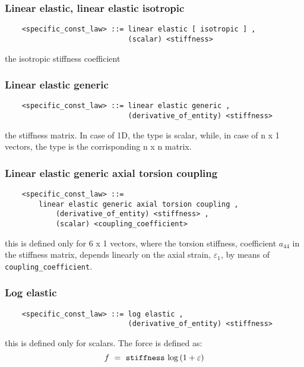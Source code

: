 \subsubsection{Linear elastic, linear elastic isotropic}
\begin{verbatim}
    <specific_const_law> ::= linear elastic [ isotropic ] , 
                             (scalar) <stiffness>
\end{verbatim}
the isotropic stiffness coefficient
  
  
\subsubsection{Linear elastic generic}
\begin{verbatim}
    <specific_const_law> ::= linear elastic generic ,  
                             (derivative_of_entity) <stiffness>
\end{verbatim}
the stiffness matrix. In case of 1D, the type is scalar, while, in case of 
n x 1 vectors, the type is the corrisponding n x n matrix.

\subsubsection{Linear elastic generic axial torsion coupling}
\begin{verbatim}
    <specific_const_law> ::= 
        linear elastic generic axial torsion coupling ,  
            (derivative_of_entity) <stiffness> ,
            (scalar) <coupling_coefficient>
\end{verbatim}
this is defined only for 6 x 1 vectors, where the torsion stiffness,
coefficient $ a_{44} $ in the stiffness matrix, depends linearly on 
the axial strain, $ \varepsilon_1 $, by means of 
\texttt{coupling\_coefficient}.
  
\subsubsection{Log elastic}
\begin{verbatim}
    <specific_const_law> ::= log elastic ,
                             (derivative_of_entity) <stiffness>      
\end{verbatim}
this is defined only for scalars. The force is defined as:
\begin{displaymath}
    f \ = \ \texttt{stiffness} \ \llk{log}\plbr{1+\varepsilon}
\end{displaymath}
  
